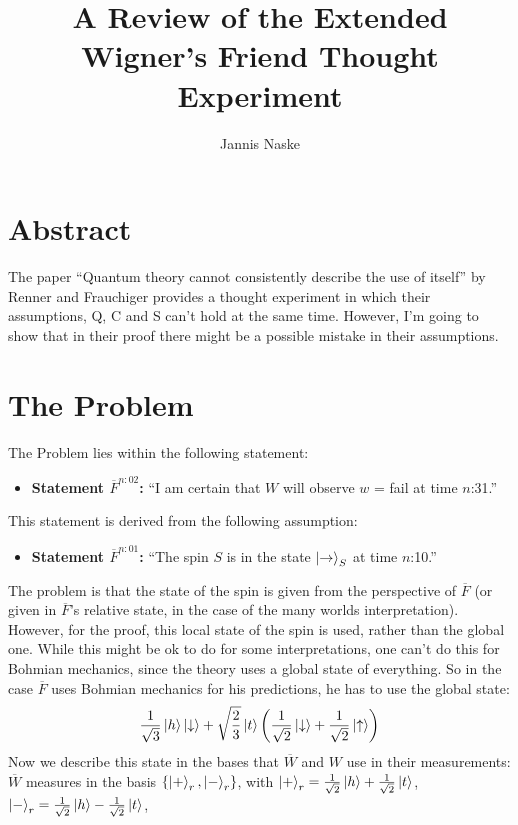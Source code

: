 \documentclass[a4paper]{article}
\title{A Review of the Extended Wigner's Friend Thought Experiment}
\author{Jannis Naske}
\begin{document}
\maketitle
\afterpage{\cfoot{\thepage}}

\section*{Abstract}
The paper ``Quantum theory cannot consistently describe the use of itself'' by Renner and Frauchiger provides a thought experiment in which their assumptions, Q, C and S can't hold at the same time.
However, I'm going to show that in their proof there might be a possible mistake in their assumptions.

\section*{The Problem}
The Problem lies within the following statement:
\begin{itemize}
	\item[] \textbf{Statement $\overline{F}^{n:02}$:} ``I am certain that $W$ will observe $w$ = fail at time $n$:31.''
\end{itemize}
This statement is derived from the following assumption:
\begin{itemize}
	\item[] \textbf{Statement $\overline{F}^{n:01}$:} ``The spin $S$ is in the state $\ket{\rightarrow}_S$ at time $n$:10.''
\end{itemize}
The problem is that the state of the spin is given from the perspective of $\overline{F}$ (or given in $\overline{F}$'s relative state, in the case of the many worlds interpretation).
However, for the proof, this local state of the spin is used, rather than the global one. While this might be ok to do for some interpretations, one can't do this for Bohmian mechanics,
since the theory uses a global state of everything. So in the case $\overline{F}$ uses Bohmian mechanics for his predictions, he has to use the global state:
\begin{align*}
\frac{1}{\sqrt{3}}\ket{h}\ket{\downarrow} + \sqrt{\frac{2}{3}}\ket{t}\qty(\frac{1}{\sqrt{2}} \ket{\downarrow} + \frac{1}{\sqrt{2}} \ket{\uparrow})
\end{align*}
Now we describe this state in the bases that $\overline{W}$ and $W$ use in their measurements:
$\overline{W}$ measures in the basis $\qty{\ket{+}_{r}, \ket{-}_{r}}$,
with $\ket{+}_{r} = \frac{1}{\sqrt{2}} \ket{h} + \frac{1}{\sqrt{2}} \ket{t}$, $\ket{-}_{r} = \frac{1}{\sqrt{2}} \ket{h} - \frac{1}{\sqrt{2}} \ket{t}$,
\end{document}
